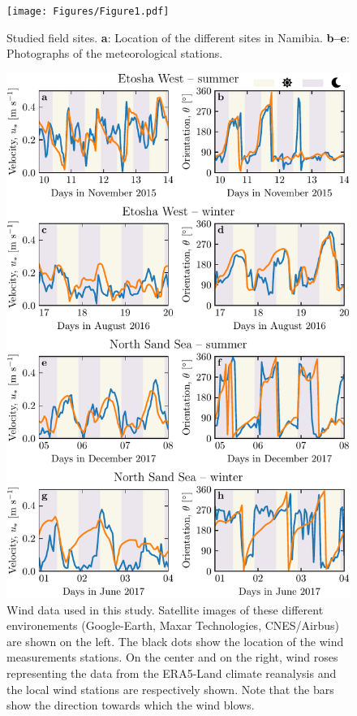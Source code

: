 \begin{figure}[t]
\centering
\texttt{[image: Figures/Figure1.pdf]}
\caption{Studied field sites. \textbf{a}: Location of the different sites in Namibia. \textbf{b--e}: Photographs of the meteorological stations.}
\label{Fig1}
\end{figure}

\begin{figure}[t]
\centering
\includegraphics[scale=1]{Figures/Figure2.pdf}
\caption{Wind data used in this study. Satellite images of these different environements (Google-Earth, Maxar Technologies, CNES/Airbus) are shown on the left. The black dots show the location of the wind measurements stations. On the center and on the right, wind roses representing the data from the ERA5-Land climate reanalysis and the local wind stations are respectively shown. Note that the bars show the direction towards which the wind blows.}
\label{Fig2}
\end{figure}


